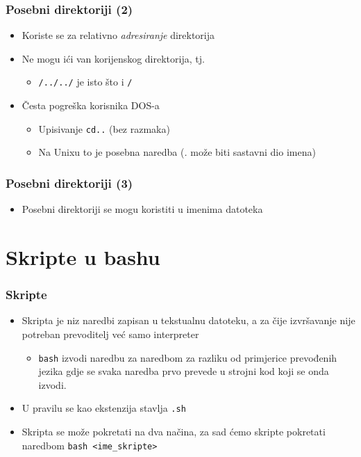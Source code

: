\documentclass{beamer}
\newcommand{\shell}[1]{\texttt{#1}}
\begin{document}
\begin{frame}[t]
\frametitle{Posebni direktoriji (2)}
\begin{itemize}
  \item Koriste se za relativno \emph{adresiranje} direktorija
  \item Ne mogu ići van korijenskog direktorija, tj.
  \begin{itemize}
    \item[] \texttt{/../../} je isto što i \texttt{/}
  \end{itemize}
  \item Česta pogreška korisnika DOS-a
  \begin{itemize}
    \item Upisivanje \texttt{cd..} (bez razmaka)
    \item Na Unixu to je posebna naredba (\emph{.} može biti sastavni dio
          imena)
  \end{itemize}
\end{itemize}
\end{frame}

\begin{frame}[t]
\frametitle{Posebni direktoriji (3)}
\begin{itemize}
  \item Posebni direktoriji se mogu koristiti u imenima datoteka
  \flushleft
\end{itemize}
\end{frame}

\section{Skripte u bashu}
\begin{frame}[t]
\frametitle{Skripte}
\begin{itemize}
  \item Skripta je niz naredbi zapisan u tekstualnu datoteku, a za čije izvršavanje nije potreban prevoditelj već samo interpreter
      \begin{itemize}
        \item \texttt{bash} izvodi naredbu za naredbom za razliku od primjerice prevođenih jezika gdje se svaka naredba prvo
            prevede u strojni kod koji se onda izvodi.
      \end{itemize}
  \item U pravilu se kao ekstenzija stavlja \texttt{.sh}
  \item Skripta se može pokretati na dva načina, za sad ćemo skripte pokretati naredbom \shell{bash <ime\_skripte>}
\end{itemize}
\end{frame}
\end{document}
